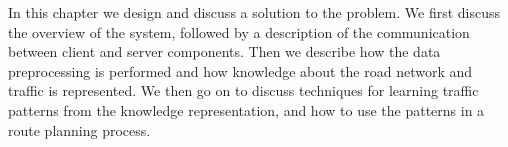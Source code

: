 In this chapter we design and discuss a solution to the problem. We first discuss the overview of the system, followed by a description of the communication between client and server components. Then we describe how the data preprocessing is performed and how knowledge about the road network and traffic is represented. We then go on to discuss techniques for learning traffic patterns from the knowledge representation, and how to use the patterns in a route planning process.